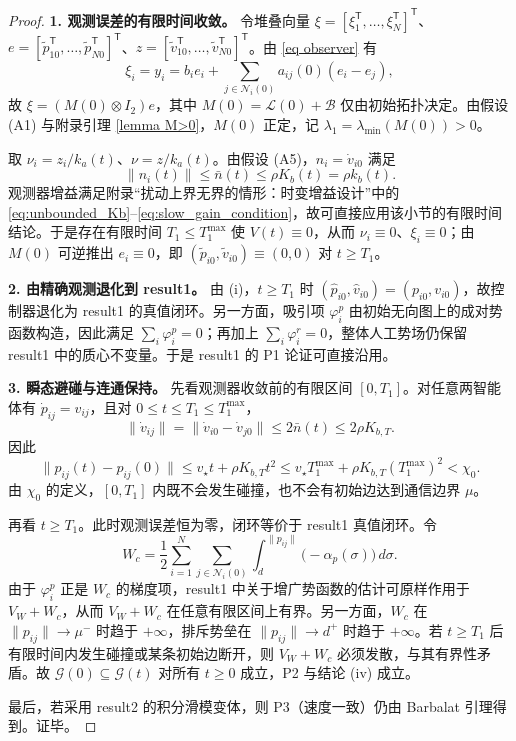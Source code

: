\begin{proof}
    \textbf{1. 观测误差的有限时间收敛。}
    令堆叠向量 $\xi=[\xi_1^\mathsf T,\dots,\xi_N^\mathsf T]^\mathsf T$、$e=[\tilde p_{10}^\mathsf T,\dots,\tilde p_{N0}^\mathsf T]^\mathsf T$、$z=[\tilde v_{10}^\mathsf T,\dots,\tilde v_{N0}^\mathsf T]^\mathsf T$。由 \eqref{eq observer} 有
    \[
        \xi_i=y_i=b_i e_i+\sum_{j\in\mathcal N_i(0)}a_{ij}(0)(e_i-e_j),
    \]
    故 $\xi=(M(0)\otimes I_2)e$，其中 $M(0)=\mathcal L(0)+\mathcal B$ 仅由初始拓扑决定。由假设 (A1) 与附录引理 \ref{lemma M>0}，$M(0)$ 正定，记 $\lambda_1=\lambda_{\min}(M(0))>0$。

    取 $\nu_i=z_i/k_a(t)$、$\nu=z/k_a(t)$。由假设 (A5)，$n_i=\dot v_{i0}$ 满足
    \[
        \|n_i(t)\|\le \bar n(t)\le \rho K_b(t)=\rho k_b(t).
    \]
    观测器增益满足附录“扰动上界无界的情形：时变增益设计”中的 \eqref{eq:unbounded_Kb}--\eqref{eq:slow_gain_condition}，故可直接应用该小节的有限时间结论。于是存在有限时间 $T_1\le T_1^{\max}$ 使 $V(t)\equiv0$，从而 $\nu_i\equiv0$、$\xi_i\equiv0$；由 $M(0)$ 可逆推出 $e_i\equiv0$，即 $(\tilde p_{i0},\tilde v_{i0})\equiv(0,0)$ 对 $t\ge T_1$。

    \textbf{2. 由精确观测退化到 result1。}
    由 (i)，$t\ge T_1$ 时 $(\hat p_{i0},\hat v_{i0})=(p_{i0},v_{i0})$，故控制器退化为 result1 的真值闭环。另一方面，吸引项 $\varphi_i^p$ 由初始无向图上的成对势函数构造，因此满足 $\sum_i\varphi_i^p=0$；再加上 $\sum_i\varphi_i^r=0$，整体人工势场仍保留 result1 中的质心不变量。于是 result1 的 P1 论证可直接沿用。

    \textbf{3. 瞬态避碰与连通保持。}
    先看观测器收敛前的有限区间 $[0,T_1]$。对任意两智能体有 $\dot p_{ij}=v_{ij}$，且对 $0\le t\le T_1\le T_1^{\max}$，
    \[
        \|\dot v_{ij}\|=\|\dot v_{i0}-\dot v_{j0}\|
        \le 2\bar n(t)\le 2\rho K_{b,T}.
    \]
    因此
    \[
        \|p_{ij}(t)-p_{ij}(0)\|
        \le v_\star t+\rho K_{b,T}t^2
        \le v_\star T_1^{\max}+\rho K_{b,T}(T_1^{\max})^2
        < \chi_0.
    \]
    由 $\chi_0$ 的定义，$[0,T_1]$ 内既不会发生碰撞，也不会有初始边达到通信边界 $\mu$。

    再看 $t\ge T_1$。此时观测误差恒为零，闭环等价于 result1 真值闭环。令
    \[
        W_c=\frac12\sum_{i=1}^N\sum_{j\in\mathcal N_i(0)}\int_d^{\|p_{ij}\|}\bigl(-\alpha_p(\sigma)\bigr)\,d\sigma .
    \]
    由于 $\varphi_i^p$ 正是 $W_c$ 的梯度项，result1 中关于增广势函数的估计可原样作用于 $V_W+W_c$，从而 $V_W+W_c$ 在任意有限区间上有界。另一方面，$W_c$ 在 $\|p_{ij}\|\to\mu^-$ 时趋于 $+\infty$，排斥势垒在 $\|p_{ij}\|\to d^+$ 时趋于 $+\infty$。若 $t\ge T_1$ 后有限时间内发生碰撞或某条初始边断开，则 $V_W+W_c$ 必须发散，与其有界性矛盾。故 $\mathcal G(0)\subseteq\mathcal G(t)$ 对所有 $t\ge0$ 成立，P2 与结论 (iv) 成立。

    最后，若采用 result2 的积分滑模变体，则 P3（速度一致）仍由 Barbalat 引理得到。证毕。
\end{proof}

